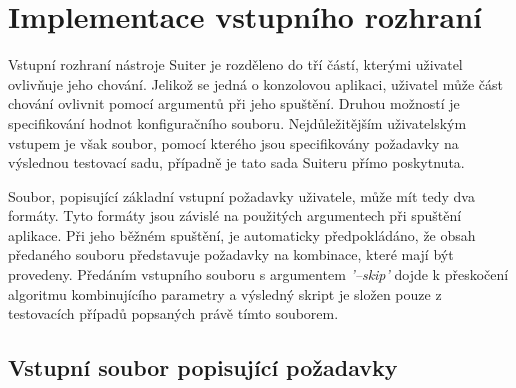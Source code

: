 






\section{Implementace vstupního rozhraní}
\label{sec_VstupniRozhrani}

Vstupní rozhraní nástroje Suiter je rozděleno do tří částí, kterými uživatel ovlivňuje jeho chování. Jelikož se jedná o konzolovou aplikaci, uživatel může část chování ovlivnit pomocí argumentů při jeho spuštění. Druhou možností je specifikování hodnot konfiguračního souboru. Nejdůležitějším uživatelským vstupem je však soubor, pomocí kterého jsou specifikovány požadavky na výslednou testovací sadu, případně je tato sada Suiteru přímo poskytnuta.


Soubor, popisující základní vstupní požadavky uživatele, může mít tedy dva formáty. Tyto formáty jsou závislé na použitých argumentech při spuštění aplikace. Při jeho běžném spuštění, je automaticky předpokládáno, že obsah předaného souboru představuje požadavky na kombinace, které mají být provedeny. Předáním vstupního souboru s argumentem \textit{'--skip'} dojde k přeskočení algoritmu kombinujícího parametry a výsledný skript je složen pouze z testovacích případů popsaných právě tímto souborem.


\subsection*{Vstupní soubor popisující požadavky}

